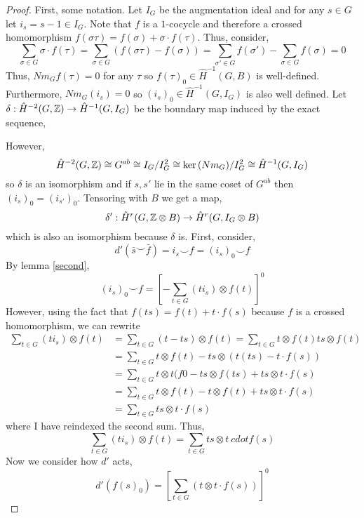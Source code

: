 \documentclass[12pt]{extarticle}
\begin{document}
\begin{proof}
First, some notation. Let $I_G$ be the augmentation ideal and for any $s \in G$ let $i_s = s - 1 \in I_G$. Note that $f$ is a $1$-cocycle and therefore a crossed homomorphism $f(\sigma \tau) =  f(\sigma) + \sigma \cdot f(\tau)$. Thus, consider,
\[ \sum_{\sigma \in G} \sigma \cdot f(\tau) = \sum_{\sigma \in G} (f(\sigma \tau) - f(\sigma)) = \sum_{\sigma' \in G} f(\sigma') - \sum_{\sigma \in G} f(\sigma) = 0 \]
Thus, $Nm_G f(\tau) = 0$ for any $\tau$ so $f(\tau)_0 \in \hat{H}^{-1}(G, B)$ is well-defined. Furthermore, $Nm_G(i_s) = 0$ so $(i_s)_0 \in \hat{H}^{-1}(G, I_G)$ is also well defined. Let $\delta : \hat{H}^{-2}(G, \mathbb{Z}) \to \hat{H}^{-1}(G, I_G)$ be the boundary map induced by the exact sequence,
\begin{center}
\end{center}
However,
\[ \hat{H}^{-2}(G, \mathbb{Z}) \cong G^{ab} \cong I_G / I_G^2 \cong \ker{(Nm_G)}/I_G^2 \cong \hat{H}^{-1}(G, I_G) \]
so $\delta$ is an isomorphism and if $s, s'$ lie in the same coset of $G^{ab}$ then $(i_s)_0 = (i_{s'})_0$. 
Tensoring with $B$ we get a map,
\[ \delta' : \hat{H}^r(G, \mathbb{Z} \otimes B) \to \hat{H}^r(G, I_G \otimes B) \]
which is also an isomorphism because $\delta$ is.  
First, consider,
\[ d'(\bar{s} \smile \bar{f}) = i_s \smile f = (i_s)_0 \smile f \]
By lemma \ref{second},
\[ (i_s)_0 \smile f = \left[ - \sum_{t \in G} (ti_s) \otimes f(t) \right]^0 \]
However, using the fact that $f(ts) = f(t) + t\cdot f(s)$ because $f$ is a crossed homomorphism, 
we can rewrite
\begin{align*}
\sum_{t \in G} (ti_s) \otimes f(t) & = \sum_{t \in G} (t - ts) \otimes f(t) = \sum_{t \in G} t \otimes f(t)  ts \otimes f(t)
\\
& = \sum_{t \in G} t \otimes f(t) - ts \otimes (t(ts)  - t \cdot f(s))
\\
& = \sum_{t \in G} t \otimes t(f0 - ts \otimes f(ts) + ts \otimes t \cdot f(s)
\\
& = \sum_{t \in G} t \otimes f(t) - t \otimes f(t) + ts \otimes t \cdot f(s)
\\
& = \sum_{t \in G} ts \otimes t \cdot f(s)
\end{align*}
where I have reindexed the second sum. Thus,
\[ \sum_{t \in G} (t i_s) \otimes f(t) = \sum_{t \in G} ts \otimes t\ cdot f(s) \]
Now we consider how $d'$ acts,
\[ d'(f(s)_0) = \left[ \sum_{t \in G} (t \otimes t \cdot f(s)) \right]^0 \]

\end{proof}
\end{document}
